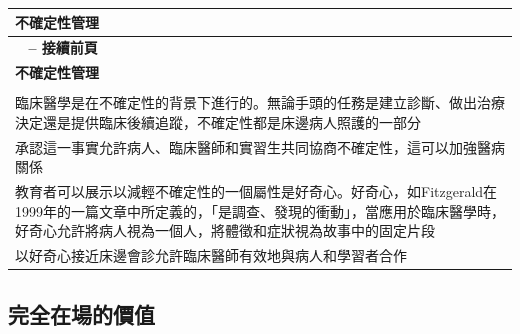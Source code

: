 \documentclass[12pt,a4paper]{article}
\begin{document}
\begin{longtable}{>{\raggedright\arraybackslash}p{15cm}}
\toprule
\textbf{\textcolor{emergency_blue}{不確定性管理}} \\
\midrule
\endfirsthead

\multicolumn{1}{c}%
{{\bfseries \tablename\ \thetable{} -- 接續前頁}} \\
\toprule
\textbf{\textcolor{emergency_blue}{不確定性管理}} \\
\midrule
\endhead

\midrule \multicolumn{1}{r}{{接續下頁}} \\ \midrule
\endfoot

\bottomrule
\endlastfoot

臨床醫學是在不確定性的背景下進行的。無論手頭的任務是建立診斷、做出治療決定還是提供臨床後續追蹤，不確定性都是床邊病人照護的一部分 \\

承認這一事實允許病人、臨床醫師和實習生共同協商不確定性，這可以加強醫病關係 \\

教育者可以展示以減輕不確定性的一個屬性是好奇心。好奇心，如Fitzgerald在1999年的一篇文章中所定義的，「是調查、發現的衝動」，當應用於臨床醫學時，好奇心允許將病人視為一個人，將體徵和症狀視為故事中的固定片段 \\

以好奇心接近床邊會診允許臨床醫師有效地與病人和學習者合作 \\
\end{longtable}

\subsection{完全在場的價值}
\end{document}
